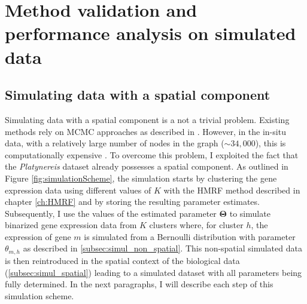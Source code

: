 \chapter{Method validation and performance analysis on simulated data}\label{ch:simulations} 

\section{Simulating data with a spatial component }
Simulating data with a spatial component is a not a trivial problem. Existing methods rely on MCMC approaches as described in \citep{Chalmond89}. However, in the \platy{} in-situ data, with a relatively large number of nodes in the graph ($\sim 34,000$), this is computationally expensive \citep{belloni09}. To overcome this problem, I exploited the fact that the {\it{Platynereis}} dataset already possesses a spatial component. As outlined in Figure \ref{fig:simulationScheme}, the simulation starts by clustering the gene expression data using different values of $K$ with the HMRF method described in chapter \ref{ch:HMRF} and by storing the resulting parameter estimates. Subsequently, I use the values of the estimated parameter $\boldsymbol{\Theta}$ to simulate binarized gene expression data from $K$ clusters where, for cluster $h$, the expression of gene $m$ is simulated from a Bernoulli distribution with parameter $\theta_{m,h}$ as described in \ref{subsec:simul_non_spatial}. This non-spatial simulated data is then reintroduced in the spatial context of the biological data (\ref{subsec:simul_spatial}) leading to a simulated dataset with all parameters being fully determined. In the next paragraphs, I will describe each step of this simulation scheme.

